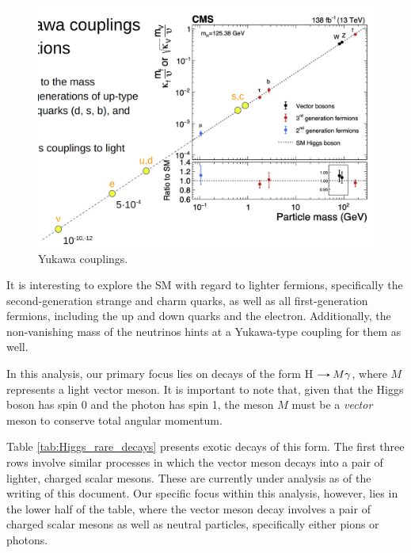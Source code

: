
\begin{figure}[!ht]
    \vspace*{-0.0cm}
    \centering
    \setlength{\mylength}{\textwidth}
    \includegraphics[width=0.80\mylength]{resources/Yukawa_couplings.png}
    \vspace*{-0.0cm}
    \caption{Yukawa couplings.}
    \label{fig:Yukawa_couplings}
    \vspace*{-0.0cm}
\end{figure}

It is interesting to explore the SM with regard to lighter fermions, specifically the second-generation strange and charm quarks, as well as all first-generation fermions, including the up and down quarks and the electron. Additionally, the non-vanishing mass of the neutrinos hints at a Yukawa-type coupling for them as well.

In this analysis, our primary focus lies on decays of the form H$\decaysto M\gamma$, where $M$ represents a light vector meson. It is important to note that, given that the Higgs boson has spin 0 and the photon has spin 1, the meson $M$ must be a \textit{vector} meson to conserve total angular momentum.

Table \ref{tab:Higgs_rare_decays} presents exotic decays of this form. The first three rows involve similar processes in which the vector meson decays into a pair of lighter, charged scalar mesons. These are currently under analysis as of the writing of this document. Our specific focus within this analysis, however, lies in the lower half of the table, where the vector meson decay involves a pair of charged scalar mesons as well as neutral particles, specifically either pions or photons.

